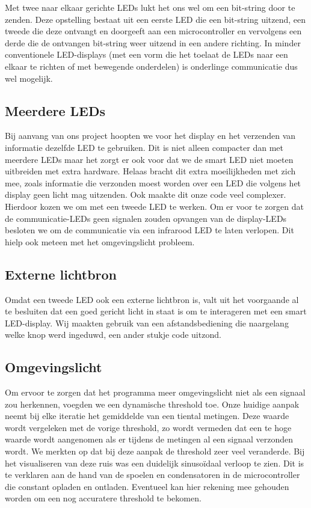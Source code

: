 \documentclass{article}
\begin{document}
Met twee naar elkaar gerichte LEDs lukt het ons wel om een bit-string door te zenden. Deze opstelling bestaat uit een eerste LED die een bit-string uitzend, een tweede die deze ontvangt en doorgeeft aan een microcontroller en vervolgens een derde die de ontvangen bit-string weer uitzend in een andere richting. In minder conventionele LED-displays (met een vorm die het toelaat de LEDs naar een elkaar te richten of met bewegende onderdelen) is onderlinge communicatie dus wel mogelijk.

\subsection{Meerdere LEDs}
Bij aanvang van ons project hoopten we voor het display en het verzenden van informatie dezelfde LED te gebruiken. Dit is niet alleen compacter dan met meerdere LEDs maar het zorgt er ook voor dat we de smart LED niet moeten uitbreiden met extra hardware. Helaas bracht dit extra moeilijkheden met zich mee, zoals informatie die verzonden moest worden over een LED die volgens het display geen licht mag uitzenden. Ook maakte dit onze code veel complexer. Hierdoor kozen we om met een tweede LED te werken. Om er voor te zorgen dat de communicatie-LEDs geen signalen zouden opvangen van de display-LEDs besloten we om de communicatie via een infrarood LED te laten verlopen. Dit hielp ook meteen met het omgevingslicht probleem. 

\subsection{Externe lichtbron}
Omdat een tweede LED ook een externe lichtbron is, valt uit het voorgaande al te besluiten dat een goed gericht licht in staat is om te interageren met een smart LED-display. Wij maakten gebruik van een afstandsbediening die naargelang welke knop werd ingeduwd, een ander stukje code uitzond.

\subsection{Omgevingslicht}
Om ervoor te zorgen dat het programma meer omgevingslicht niet als een signaal zou herkennen, voegden we een dynamische threshold toe.
Onze huidige aanpak neemt bij elke iteratie het gemiddelde van een tiental metingen. Deze waarde wordt vergeleken met de vorige threshold, zo wordt vermeden dat een te hoge waarde wordt aangenomen als er tijdens de metingen al een signaal verzonden wordt.
We merkten op dat bij deze aanpak de threshold zeer veel veranderde. Bij het visualiseren van deze ruis was een duidelijk sinusoïdaal verloop te zien. Dit is te verklaren aan de hand van de spoelen en condensatoren in de microcontroller die constant opladen en ontladen. Eventueel kan hier rekening mee gehouden worden om een nog accuratere threshold te bekomen.
\end{document}

